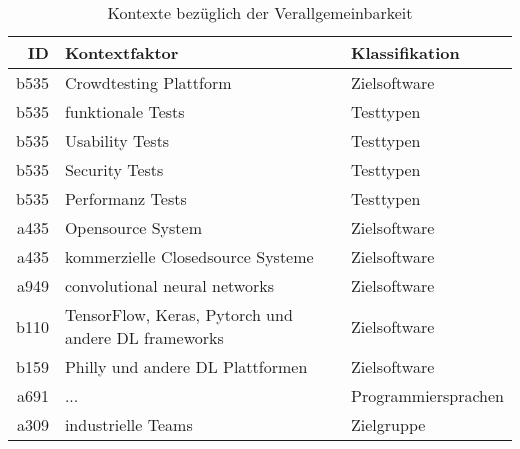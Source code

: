 \begin{table}[h!]
    \begin{tabular}{ r | l | l  }
        ID & Kontextfaktor & Klassifikation \\
        \hline
        b535 & Crowdtesting Plattform & Zielsoftware\\
        b535 & funktionale Tests & Testtypen \\
        b535 & Usability Tests & Testtypen \\
        b535 & Security Tests & Testtypen \\
        b535 & Performanz Tests & Testtypen \\
        a435 & Opensource System & Zielsoftware \\
        a435 & kommerzielle Closedsource Systeme & Zielsoftware \\
        a949 & convolutional neural networks & Zielsoftware  \\
        b110 & TensorFlow, Keras, Pytorch und andere DL frameworks & Zielsoftware  \\
        b159 & Philly und andere DL Plattformen & Zielsoftware \\
        a691 & ... & Programmiersprachen \\
        a309 & industrielle Teams & Zielgruppe  \\
    \end{tabular}
    \caption{Kontexte bezüglich der Verallgemeinbarkeit}
    \label{table:kontexte-verallgemeinbarkeit}
\end{table}
